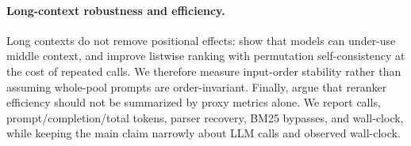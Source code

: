 \paragraph{Long-context robustness and efficiency.}
Long contexts do not remove positional effects:
\citet{liu2024lostmiddle} show that models can under-use middle context,
and \citet{tang2024foundmiddle} improve listwise ranking with permutation
self-consistency at the cost of repeated calls. We therefore measure
input-order stability rather than assuming whole-pool prompts are
order-invariant. Finally, \citet{peng2025flopsreranking} argue that
reranker efficiency should not be summarized by proxy metrics alone. We
report calls, prompt/completion/total tokens, parser recovery, BM25
bypasses, and wall-clock, while keeping the main claim narrowly about LLM
calls and observed wall-clock.
